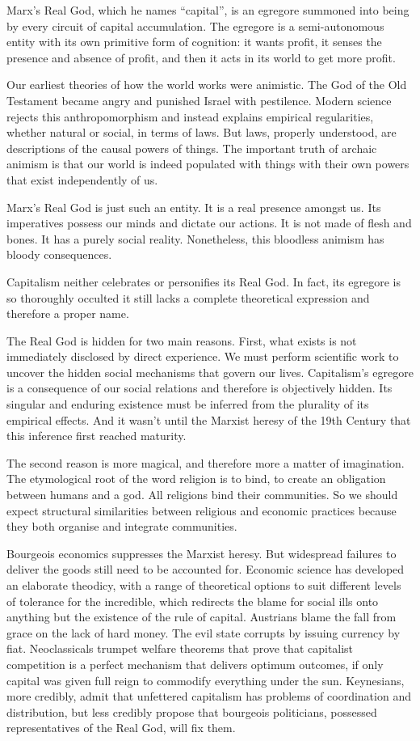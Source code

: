 \documentclass[
]{book}
\begin{document}
Marx's Real God, which he names ``capital'', is an egregore summoned into being by every circuit of capital accumulation. The egregore is a semi-autonomous entity with its own primitive form of cognition: it wants profit, it senses the presence and absence of profit, and then it acts in its world to get more profit.

Our earliest theories of how the world works were animistic. The God of the Old Testament became angry and punished Israel with pestilence. Modern science rejects this anthropomorphism and instead explains empirical regularities, whether natural or social, in terms of laws. But laws, properly understood, are descriptions of the causal powers of things. The important truth of archaic animism is that our world is indeed populated with things with their own powers that exist independently of us.

Marx's Real God is just such an entity. It is a real presence amongst us. Its imperatives possess our minds and dictate our actions. It is not made of flesh and bones. It has a purely social reality. Nonetheless, this bloodless animism has bloody consequences.

Capitalism neither celebrates or personifies its Real God. In fact, its egregore is so thoroughly occulted it still lacks a complete theoretical expression and therefore a proper name.

The Real God is hidden for two main reasons. First, what exists is not immediately disclosed by direct experience. We must perform scientific work to uncover the hidden social mechanisms that govern our lives. Capitalism's egregore is a consequence of our social relations and therefore is objectively hidden. Its singular and enduring existence must be inferred from the plurality of its empirical effects. And it wasn't until the Marxist heresy of the 19th Century that this inference first reached maturity.

The second reason is more magical, and therefore more a matter of imagination. The etymological root of the word religion is to bind, to create an obligation between humans and a god. All religions bind their communities. So we should expect structural similarities between religious and economic practices because they both organise and integrate communities.

Bourgeois economics suppresses the Marxist heresy. But widespread failures to deliver the goods still need to be accounted for. Economic science has developed an elaborate theodicy, with a range of theoretical options to suit different levels of tolerance for the incredible, which redirects the blame for social ills onto anything but the existence of the rule of capital. Austrians blame the fall from grace on the lack of hard money. The evil state corrupts by issuing currency by fiat. Neoclassicals trumpet welfare theorems that prove that capitalist competition is a perfect mechanism that delivers optimum outcomes, if only capital was given full reign to commodify everything under the sun. Keynesians, more credibly, admit that unfettered capitalism has problems of coordination and distribution, but less credibly propose that bourgeois politicians, possessed representatives of the Real God, will fix them.
\end{document}
